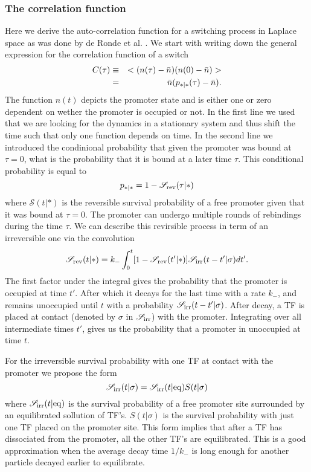 \subsubsection{The correlation function}
Here we derive the auto-correlation function for a switching process in Laplace space as was done by de Ronde et al. \cite{DeRonde2012}. We start with writing down the general expression for the correlation function of a switch
\begin{eqnarray}
 C(\tau) & \equiv & < (n(\tau) - \bar{n})(n(0) - \bar{n}) > \\
  	& = & \bar{n}(p_{*|*}(\tau)-\bar{n}).
 \elabel{corr_func}
\end{eqnarray}
The function $n(t)$ depicts the promoter state and is either one or zero dependent on wether the promoter is occupied or not. In the first line we used that we are looking for the dynamics in a stationary system and thus shift the time such that only one function depends on time. In the second line we introduced the condinional probability that given the promoter was bound at $\tau=0$, what is the probability that it is bound at a later time $\tau$. This conditional probability is equal to
\begin{equation}
 p_{*|*} = 1 - \mathscr{S}_{\rm rev}(\tau|*)
\end{equation}
where $\mathscr{S}(t|*)$ is the reversible survival probability of a free promoter given that it was bound at $\tau=0$. The promoter can undergo multiple rounds of rebindings during the time $\tau$. We can describe this revirsible process in term of an irreversible one via the convolution \cite{Agmon1990}
\begin{equation}
 \mathscr{S}_{\rm rev}(t|*) = k_- \int_0^t [1-\mathscr{S}_{\rm rev}(t'|*)]\mathscr{S}_{\rm irr}(t-t'|\sigma)dt'.
 \elabel{rev_conv}
\end{equation}
The first factor under the integral gives the probability that the promoter is occupied at time $t'$. After which it decays for the last time with a rate $k_-$, and remains unoccupied until $t$ with a probability $\mathscr{S}_{\rm irr}(t-t'|\sigma)$. After decay, a TF is placed at contact (denoted by $\sigma$ in $\mathscr{S}_{\rm irr}$) with the promoter. Integrating over all intermediate times $t'$, gives us the probability that a promoter in unoccupied at time $t$. 

For the irreversible survival probability with one TF at contact with the promoter we propose the form
\begin{equation}
 \mathscr{S}_{\rm irr}(t|\sigma) = \mathscr{S}_{\rm irr}(t|{\rm eq}) S(t|\sigma)
 \elabel{Def_Ssi}
\end{equation}
where $\mathscr{S}_{\rm irr}(t|{\rm eq})$ is the survival probability of a free promoter site surrounded by an equilibrated sollution of TF's. $S(t|\sigma)$ is the survival probability with just one TF placed on the promoter site. This form implies that after a TF has dissociated from the promoter, all the other TF's are equilibrated. This is a good approximation when the average decay time $1/k_-$ is long enough for another particle decayed earlier to equilibrate. 

